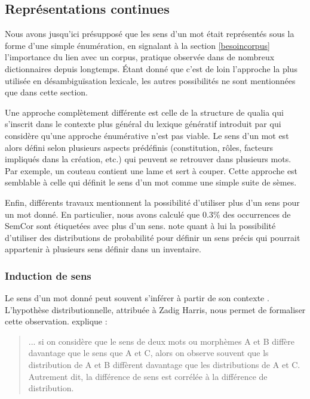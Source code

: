 \subsection{Représentations continues}
\label{sensfunky}

Nous avons jusqu'ici présupposé que les sens d'un mot était représentés sous la
forme d'une simple énumération, en signalant à la section \ref{besoincorpus}
l'importance du lien avec un corpus, pratique observée dans de nombreux
dictionnaires depuis longtemps. Étant donné que c'est de loin l'approche la
plus utilisée en désambiguïsation lexicale, les autres possibilités ne sont
mentionnées que dans cette section.

Une approche complètement différente est celle de la structure de qualia
\citep{johnston1996qualia} qui s'inscrit dans le contexte plus général du
lexique génératif introduit par \cite{pustejovsky1991generative} qui considère
qu'une approche énumérative n'est pas viable. Le sens d'un mot est alors défini
selon plusieurs aspects prédéfinis (constitution, rôles, facteurs impliqués
dans la création, etc.) qui peuvent se retrouver dans plusieurs mots. Par
exemple, un couteau contient une lame et sert à couper. Cette approche est
semblable à celle qui définit le sens d'un mot comme une simple suite de sèmes.

Enfin, différents travaux mentionnent la possibilité d'utiliser plus d'un sens
pour un mot donné. En particulier, nous avons calculé que 0.3\% des occurrences
de SemCor sont étiquetées avec plus d'un sens. \cite{smith2011rumble} note
quant à lui la possibilité d'utiliser des distributions de probabilité pour
définir un sens précis qui pourrait appartenir à plusieurs sens définir dans un
inventaire.

\subsubsection{Induction de sens}
\label{distrib}

Le sens d'un mot donné peut souvent s'inférer à partir de son contexte
\citep{pantel2002discovering}. L'hypothèse distributionnelle, attribuée à Zadig
Harris, nous permet de formaliser cette observation.
\cite[p.~786]{harris1954distributional} explique :

\begin{quote} ... si on considère que le sens de deux mots ou morphèmes A et B
    diffère davantage que le sens que A et C, alors on observe souvent que ls
    distribution de A et B diffèrent davantage que les distributions de A et C.
    Autrement dit, la différence de sens est corrélée à la différence de
    distribution.  \end{quote}

